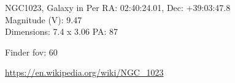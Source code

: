 \begin{block}{NGC1023, Galaxy in Per}
    RA: 02:40:24.01, Dec: +39:03:47.8 \\ 
    Magnitude (V): 9.47 \\ 
    Dimensions: 7.4 x 3.06 PA: 87 

    Finder fov: 60 

    \url{https://en.wikipedia.org/wiki/NGC_1023} 
\end{block}